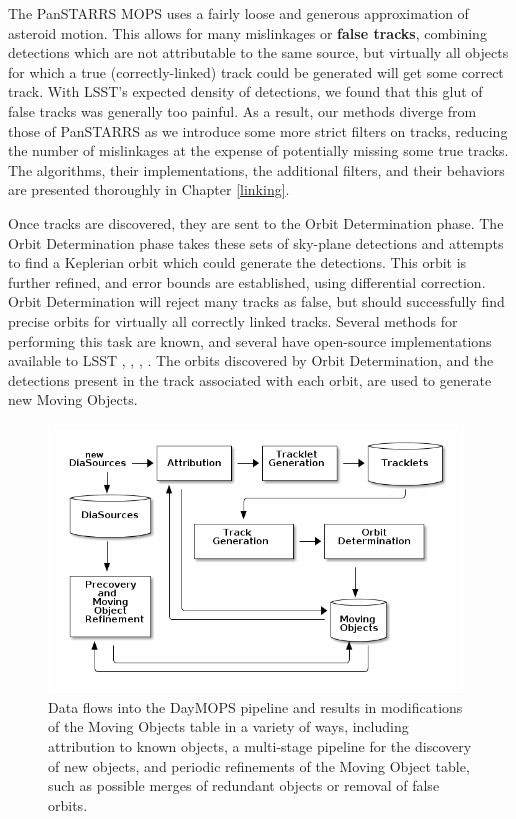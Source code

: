 \documentclass[12pt,preprint]{aastex}
\begin{document}
The PanSTARRS MOPS uses a fairly loose and generous approximation of
asteroid motion.  This allows for many mislinkages or \textbf{false
  tracks}, combining detections which are not attributable to the same
source, but virtually all objects for which a true (correctly-linked)
track could be generated will get some correct track.  With LSST's
expected density of detections, we found that this glut of false
tracks was generally too painful.  As a result, our methods diverge
from those of PanSTARRS as we introduce some more strict filters on
tracks, reducing the number of mislinkages at the expense of
potentially missing some true tracks.  The algorithms, their
implementations, the additional filters, and their behaviors are
presented thoroughly in Chapter \ref{linking}.

Once tracks are discovered, they are sent to the Orbit Determination
phase. The Orbit Determination phase takes these sets of sky-plane
detections and attempts to find a Keplerian orbit which could generate
the detections.  This orbit is further refined, and error bounds are
established, using differential correction.  Orbit Determination will
reject many tracks as false, but should successfully find precise
orbits for virtually all correctly linked tracks.  Several methods for
performing this task are known, and several have open-source implementations
available to LSST \citep{Milani04orbitdetermination},
\citep{Milani2006}, \citep{OpenOrb2009}, \citep{granvik_thesis}.  The
orbits discovered by Orbit Determination, and the detections present
in the track associated with each orbit, are used to generate new
Moving Objects.

\begin{figure}[h]
\begin{center}
  \includegraphics[width=11cm]{illustrations/mopsDiagram.png}
\end{center}
\caption{ Data flows into the DayMOPS pipeline and results in
  modifications of the Moving Objects table in a variety of ways,
  including attribution to known objects, a multi-stage pipeline for
  the discovery of new objects, and periodic refinements of the Moving
  Object table, such as possible merges of redundant objects or
  removal of false orbits. }
\label{mopsDiagram}
\end{figure}
\end{document}
